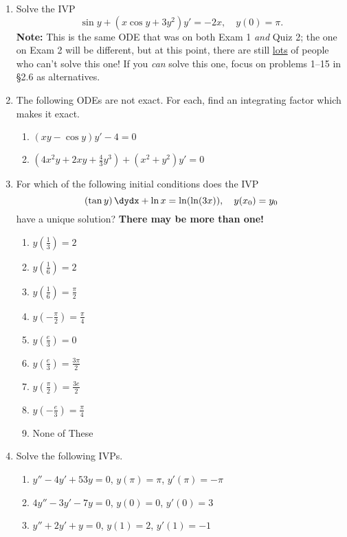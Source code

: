 \documentclass[12pt]{article}
\theoremstyle{definition}
\theoremstyle{underl}
\begin{document}
	\begin{enumerate}[topsep=0.125in,itemsep=3mm]
		\item Solve the IVP \[\sin{y}+(x\cos{y}+3y^2)y'=-2x,\quad y(0)=\pi.\]
		\textbf{Note:} This is the same ODE that was on both Exam 1 \textit{and} Quiz 2; the one on Exam 2 will be different, but at this point, there are still \ul{lots} of people who can't solve this one! If you \textit{can} solve this one, focus on problems 1--15 in \S2.6 as alternatives.
		
		\item The following ODEs are not exact. For each, find an integrating factor which makes it exact.
		\begin{enumerate}[itemsep=3mm]
			\item $\left(x y-\cos{y}\right)y'-4=0$
			\item $\left(4x^2y+2xy+\frac{4}{3}y^3\right)+(x^2+y^2)y'=0$
		\end{enumerate}
		
		\item For which of the following initial conditions does the IVP\vspace{-3mm} 
		\[\left(\tan{y}\right)\dydx+\ln{x}=\ln(\ln(3 x)),\quad y(x_0)=y_0\vspace{-3mm}\]
		have a unique solution? \textbf{There may be more than one!}
		\vspace{0mm}
		\begin{multicols}{3}
			\begin{enumerate}[itemsep=3mm,leftmargin=0.5in,rightmargin=0.5in,label=\roman*.]
				\item $y\left(\frac{1}{3}\right)=2$
				\item $y\left(\frac{1}{6}\right)=2$
				\item $y\left(\frac{1}{6}\right)=\frac{\pi}{2}$
				\item $y\left(-\frac{\pi}{2}\right)=\frac{\pi}{4}$
				\item $y\left(\frac{e}{3}\right)=0$
				\item $y\left(\frac{e}{3}\right)=\frac{3\pi}{2}$
				\item $y\left(\frac{\pi}{2}\right)=\frac{3e}{2}$
				\item $y\left(-\frac{e}{3}\right)=\frac{\pi}{4}$
				\item None of These
			\end{enumerate}
		\end{multicols}
		
		\item Solve the following IVPs.
		\begin{enumerate}
			\item $y''-4y'+53y=0$, $y(\pi)=\pi$, $y'(\pi)=-\pi$
			\item $4y''-3y'-7y=0$, $y(0)=0$, $y'(0)=3$
			\item $y''+2y'+y=0$, $y(1)=2$, $y'(1)=-1$
		\end{enumerate} 
		

\end{enumerate}
\end{document}
